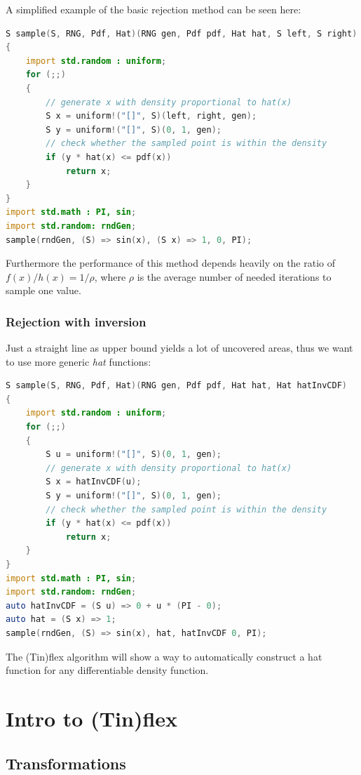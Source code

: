 \documentclass[]{article}
\begin{document}
A simplified example of the basic rejection method can be seen here:

\begin{lstlisting}[language=D]
S sample(S, RNG, Pdf, Hat)(RNG gen, Pdf pdf, Hat hat, S left, S right)
{
    import std.random : uniform;
    for (;;)
    {
        // generate x with density proportional to hat(x)
        S x = uniform!("[]", S)(left, right, gen);
        S y = uniform!("[]", S)(0, 1, gen);
        // check whether the sampled point is within the density
        if (y * hat(x) <= pdf(x))
            return x;
    }
}
import std.math : PI, sin;
import std.random: rndGen;
sample(rndGen, (S) => sin(x), (S x) => 1, 0, PI);
\end{lstlisting}

Furthermore the performance of this method depends heavily on the ratio of $f(x) / h(x) = 1 / \rho$, where $\rho$ is the average number of needed iterations to sample one value.

\subsubsection{Rejection with inversion}

Just a straight line as upper bound yields a lot of uncovered areas, thus we want to use more generic \textit{hat} functions:

\begin{lstlisting}[language=D]
S sample(S, RNG, Pdf, Hat)(RNG gen, Pdf pdf, Hat hat, Hat hatInvCDF)
{
    import std.random : uniform;
    for (;;)
    {
        S u = uniform!("[]", S)(0, 1, gen);
        // generate x with density proportional to hat(x)
        S x = hatInvCDF(u);
        S y = uniform!("[]", S)(0, 1, gen);
        // check whether the sampled point is within the density
        if (y * hat(x) <= pdf(x))
            return x;
    }
}
import std.math : PI, sin;
import std.random: rndGen;
auto hatInvCDF = (S u) => 0 + u * (PI - 0);
auto hat = (S x) => 1;
sample(rndGen, (S) => sin(x), hat, hatInvCDF 0, PI);
\end{lstlisting}

The (Tin)flex algorithm will show a way to automatically construct a hat function for any differentiable density function.

\section{Intro to (Tin)flex}

\subsection{Transformations}
\end{document}
